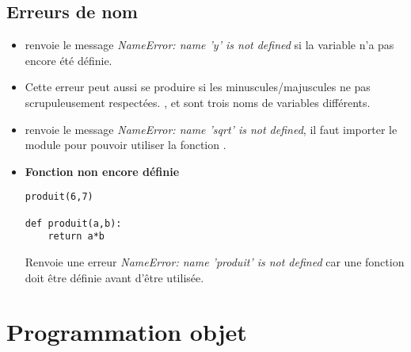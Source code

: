 \documentclass[11pt,class=report,crop=false]{standalone}
\begin{document}
\subsection{Erreurs de nom}

\begin{itemize}
  
  \item {} \quad \Python{} renvoie le message \emph{NameError: name 'y' is not defined} si la variable  n'a pas encore été définie.
  
  \item Cette erreur peut aussi se produire si les minuscules/majuscules ne pas scrupuleusement respectées. 
  ,  et  sont trois noms de variables différents.
  
  \item {} \quad \Python{} renvoie le message \emph{NameError: name 'sqrt' is not defined}, il faut importer le module  pour pouvoir utiliser la fonction .
  
   \item \textbf{Fonction non encore définie}  
\begin{lstlisting}
produit(6,7)

def produit(a,b):
    return a*b
\end{lstlisting}   
  
Renvoie une erreur \emph{NameError: name 'produit' is not defined} car une fonction doit être définie avant d'être utilisée.

\end{itemize}



\section{Programmation objet}

\end{document}
